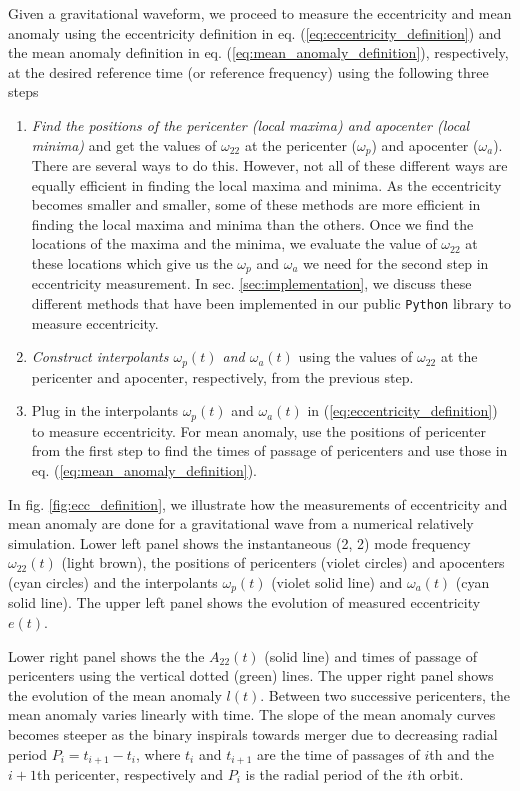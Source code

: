 \documentclass[aps,prd,amsmath,floats,floatfix, twocolumn,
superscriptaddress,nofootinbib,showpacs]{revtex4-1}
\begin{document}
Given a gravitational waveform, we proceed to measure the eccentricity
and mean anomaly using the eccentricity definition in
eq. (\ref{eq:eccentricity_definition}) and the mean anomaly definition
in eq. (\ref{eq:mean_anomaly_definition}), respectively, at the
desired reference time (or reference frequency) using the following
three steps

\begin{enumerate}
\item {\itshape Find the positions of the pericenter (local maxima)
and apocenter (local minima)} and get the values of $\omega_{22}$ at
the pericenter ($\omega_p$) and apocenter ($\omega_a$). There are
several ways to do this. However, not all of these different ways are
equally efficient in finding the local maxima and minima.  As the
eccentricity becomes smaller and smaller, some of these methods are
more efficient in finding the local maxima and minima than the
others. Once we find the locations of the maxima and the minima, we
evaluate the value of $\omega_{22}$ at these locations which give us
the $\omega_p$ and $\omega_a$ we need for the second step in
eccentricity measurement. In sec. \ref{sec:implementation}, we discuss
these different methods that have been implemented in our public
\texttt{Python} library to measure eccentricity.
\item {\itshape Construct interpolants $\omega_p(t)$ and
$\omega_a(t)$} using the values of $\omega_{22}$ at the pericenter and
apocenter, respectively, from the previous step.
\item Plug in the interpolants $\omega_p(t)$ and $\omega_a(t)$ in
(\ref{eq:eccentricity_definition}) to measure eccentricity. For mean
anomaly, use the positions of pericenter from the first step to find
the times of passage of pericenters and use those in
eq. (\ref{eq:mean_anomaly_definition}).
\end{enumerate}

In fig. \ref{fig:ecc_definition}, we illustrate how the measurements
of eccentricity and mean anomaly are done for a gravitational wave
from a numerical relatively simulation. Lower left panel shows the
instantaneous (2, 2) mode frequency $\omega_{22}(t)$ (light brown),
the positions of pericenters (violet circles) and apocenters (cyan
circles) and the interpolants $\omega_p(t)$ (violet solid line) and
$\omega_a(t)$ (cyan solid line). The upper left panel shows the
evolution of measured eccentricity $e(t)$.

Lower right panel shows the the $A_22(t)$ (solid line) and times of
passage of pericenters using the vertical dotted (green) lines. The
upper right panel shows the evolution of the mean anomaly
$l(t)$. Between two successive pericenters, the mean anomaly varies
linearly with time. The slope of the mean anomaly curves becomes
steeper as the binary inspirals towards merger due to decreasing
radial period $P_{i} = t_{i+1} - t_i$, where $t_{i}$ and $t_{i+1}$ are
the time of passages of $i$th and the $i+1$th pericenter, respectively
and $P_i$ is the radial period of the $i$th orbit.
\end{document}
